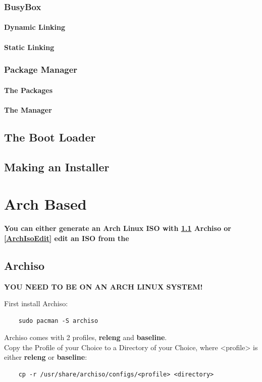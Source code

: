 \documentclass{article}
\begin{document}
		\subsubsection{BusyBox}
			\paragraph{Dynamic Linking}
			\paragraph{Static Linking}	
		\subsubsection{Package Manager}	
			\paragraph{The Packages}
			\paragraph{The Manager}
		\subsection{The Boot Loader}
		\subsection{Making an Installer}
\section{Arch Based}
\textbf{You can either generate an Arch Linux ISO with \ref{Archiso} Archiso or \ref{ArchIsoEdit} edit an ISO from the }
\subsection{Archiso}
	\label{Archiso}
	\textbf{YOU NEED TO BE ON AN ARCH LINUX SYSTEM!}

	First install Archiso:
	\begin{lstlisting}
	sudo pacman -S archiso
	\end{lstlisting}
	Archiso comes with 2 profiles, \textbf{releng} and \textbf{baseline}.
	\\
	Copy the Profile of your Choice to a Directory of your Choice, where <profile> is either \textbf{releng} or \textbf{baseline}:
	\begin{lstlisting}
	cp -r /usr/share/archiso/configs/<profile> <directory>
	\end{lstlisting}
\end{document}
